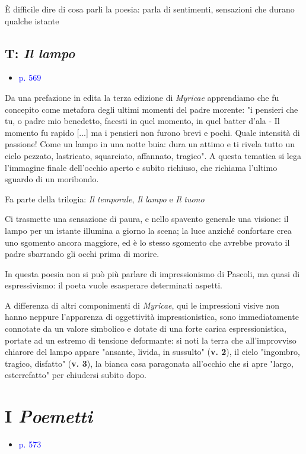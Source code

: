 \documentclass[a4paper, twoside, titlepage]{book}
\newcommand{\elenco}[1]{%
\begin{itemize}
#1
\end{itemize}}
\renewcommand{\emph}[1]{\textcolor{blue}{#1}}
\begin{document}
È difficile dire di cosa parli la poesia: parla di sentimenti, sensazioni che durano qualche istante



\section{T: \textit{Il lampo}}
\elenco{\item \emph{p. 569}}

Da una prefazione in edita la terza edizione di \textit{Myricae} apprendiamo che fu concepito come metafora degli ultimi momenti del padre morente: "i pensieri che tu, o padre mio benedetto, facesti in quel momento, in quel batter d'ala - Il momento fu rapido [...] ma i pensieri non furono brevi e pochi. Quale intensità di passione! Come un lampo in una notte buia: dura un attimo e ti rivela tutto un cielo pezzato, lastricato, squarciato, affannato, tragico". A questa tematica si lega l'immagine finale dell'occhio aperto e subito richiuso, che richiama l'ultimo sguardo di un moribondo.

Fa parte della trilogia: \textit{Il temporale}, \textit{Il lampo} e \textit{Il tuono}

Ci trasmette una sensazione di paura, e nello spavento generale una visione: il lampo per un istante illumina a giorno la scena; la luce anziché confortare crea uno sgomento ancora maggiore, ed è lo stesso sgomento che avrebbe provato il padre sbarrando gli occhi prima di morire.

In questa poesia non si può più parlare di impressionismo di Pascoli, ma quasi di espressivismo: il poeta vuole esasperare determinati aspetti.

A differenza di altri componimenti di \textit{Myricae}, qui le impressioni visive non hanno neppure l'apparenza di oggettività impressionistica, sono immediatamente connotate da un valore simbolico e dotate di una forte carica espressionistica, portate ad un estremo di tensione deformante: si noti la terra che all'improvviso chiarore del lampo appare "ansante, livida, in sussulto" (\textbf{v. 2}), il cielo "ingombro, tragico, disfatto" (\textbf{v. 3}), la bianca casa paragonata all'occhio che si apre "largo, esterrefatto" per chiudersi subito dopo.


\chapter{I \textit{Poemetti}}

\elenco{\item \emph{p. 573}}
\end{document}
